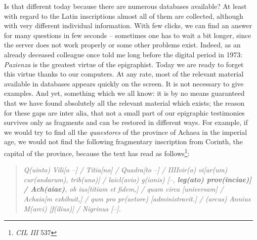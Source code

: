 \documentclass[amsthm,ebook]{saparticle}
\begin{document}
Is that different today because there are numerous databases available? At least 
with regard to the Latin inscriptions almost all of them are collected, although 
with very different individual information. With few clicks, we can find an answer 
for many questions in few seconds – sometimes one has to wait a bit longer, since 
the server does not work properly or some other problems exist. Indeed, as an already 
deceased colleague once told me long before the digital period in 1973: \textit{Pazienza} 
is the greatest virtue of the epigraphist. Today we are ready to forget this virtue 
thanks to our computers. At any rate, most of the relevant material available in 
databases appears quickly on the screen. It is not necessary to give examples. 
And yet, something which we all know: it is by no means guaranteed that we have 
found absolutely all the relevant material which exists; the reason for these gaps 
are inter alia, that not a small part of our epigraphic testimonies survives only 
as fragments and can be restored in different ways. For example, if we would try 
to find all the \textit{quaestores }of the province of Achaea in the imperial age, 
we would not find the following fragmentary inscription from Corinth, the capital 
of the province, because the text has read as follows\footnote{\emph{CIL III} 537}: 

\begin{quote}

{\it Q(uinto) Vili[o --] / Titia[no] / Quadra[to --] / IIIIvir(o) vi[ar(um) cur(andarum), trib(uno)] / laicl(avio) g(ionis) [--, \textbf{leg(ato) prov(inciae)] / Ach(aiae)}, ob ius[titiam et fidem,] / quam circa [universam] / Achaia[m exhibuit,] / qum pro pr(aetore) [administravit.] / (arcus) Annius M(arci) [f(ilius)] / Nigrinus [--].}
\end{quote}
\end{document}
